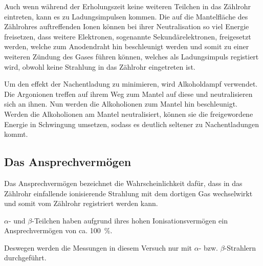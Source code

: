 Auch wenn während der Erholungszeit keine weiteren Teilchen in das
Zählrohr eintreten, kann es zu Ladungsimpulsen kommen. Die auf die
Mantelfläche des Zählrohres auftreffenden Ionen können bei ihrer
Neutralisation so viel Energie freisetzen, dass weitere Elektronen,
sogenannte Sekundärelektronen, freigesetzt werden, welche zum
Anodendraht hin beschleunigt werden und somit zu einer weiteren Zündung
des Gases führen können, welches als Ladungsimpuls registiert wird,
obwohl keine Strahlung in das Zählrohr eingetreten ist.

Um den effekt der Nachentladung zu minimieren, wird Alkoholdampf
verwendet. Die Argonionen treffen auf ihrem Weg zum Mantel auf diese und
neutralisieren sich an ihnen. Nun werden die Alkoholionen zum Mantel hin
beschleunigt. Werden die Alkoholionen am Mantel neutralisiert, können
sie die freigewordene Energie in Schwingung umsetzen, sodass es deutlich
seltener zu Nachentladungen kommt.
%
\subsection{Das Ansprechvermögen}
%
Das Ansprechvermögen bezeichnet die Wahrscheinlichkeit dafür, dass in
das Zählrohr einfallende ionisierende Strahlung mit dem dortigen Gas
wechselwirkt und somit vom Zählrohr registriert werden kann.

$\alpha$- und $\beta$-Teilchen haben aufgrund ihres hohen
Ionisationsvermögen ein Ansprechvermögen von ca. \SI{100}{\percent}.

Deswegen werden die Messungen in diesem Versuch nur mit $\alpha$-
bzw. $\beta$-Strahlern durchgeführt.

\FloatBarrier
%